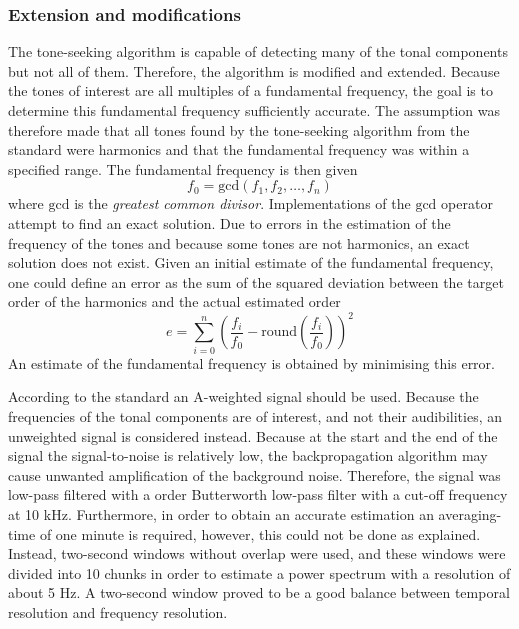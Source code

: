 \documentclass[10pt,twocolumn]{article}
\begin{document}
\subsubsection{Extension and modifications}
The tone-seeking algorithm is capable of detecting many of the tonal components
but not all of them. Therefore, the algorithm is modified and extended.
Because the tones of interest are all multiples of a
fundamental frequency, the goal is to determine this fundamental frequency
sufficiently accurate. The assumption was therefore made that all tones found by the
tone-seeking algorithm from the standard were harmonics and that the fundamental
frequency was within a specified range.
The fundamental frequency is then given
\begin{equation}
 f_{0} = \mathrm{gcd}\left(f_1, f_2, \dots, f_n \right)
\end{equation}
where $\mathrm{gcd}$ is the \emph{greatest common divisor}.
Implementations of the $\mathrm{gcd}$ operator attempt to find an exact solution.
Due to errors in the estimation of the frequency of the tones and because some tones are
not harmonics, an exact solution does not exist. Given an initial estimate of
the fundamental frequency, one could define an error as the sum of the squared
deviation between the target order of the harmonics and the actual estimated
order
\begin{equation}\label{eq:tool:features:error}
 e = \sum_{i=0}^{n} \left( \frac{f_i}{f_0} - \mathrm{round}\left(\frac{f_i}{f_0}\right) \right)^2
\end{equation}
An estimate of the fundamental frequency is obtained by minimising this error.

According to the standard an A-weighted signal should be used. Because the
frequencies of the tonal components are of interest, and not their audibilities,
an unweighted signal is considered instead. Because at the start and the end of
the signal the signal-to-noise is relatively low, the backpropagation algorithm
may cause unwanted amplification of the background noise. Therefore, the signal
was low-pass filtered with a  order Butterworth low-pass filter with a
cut-off frequency at 10 kHz. Furthermore, in order to obtain an accurate
estimation an averaging-time of one minute is required, however, this could not
be done as explained. Instead, two-second windows without overlap were used, and
these windows were divided into 10 chunks in order to estimate a power spectrum
with a resolution of about 5 Hz. A two-second window proved to be a good balance
between temporal resolution and frequency resolution.
\end{document}
